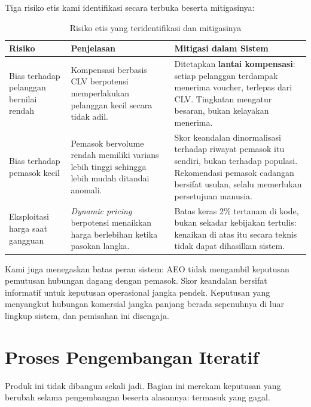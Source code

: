 \documentclass[12pt,a4paper]{article}
\begin{document}
Tiga risiko etis kami identifikasi secara terbuka beserta mitigasinya:

\begin{table}[H]
  \centering\footnotesize
  \caption{Risiko etis yang teridentifikasi dan mitigasinya}
  \begin{tabularx}{\textwidth}{L{3.5cm} Y Y}
    \toprule
    \textbf{Risiko} & \textbf{Penjelasan} & \textbf{Mitigasi dalam Sistem} \\
    \midrule
    Bias terhadap pelanggan bernilai rendah
      & Kompensasi berbasis CLV berpotensi memperlakukan pelanggan kecil secara tidak adil.
      & Ditetapkan \textbf{lantai kompensasi}: setiap pelanggan terdampak menerima voucher, terlepas dari CLV. Tingkatan mengatur besaran, bukan kelayakan menerima. \\[1.5pt]
    Bias terhadap pemasok kecil
      & Pemasok bervolume rendah memiliki varians lebih tinggi sehingga lebih mudah ditandai anomali.
      & Skor keandalan dinormalisasi terhadap riwayat pemasok itu sendiri, bukan terhadap populasi. Rekomendasi pemasok cadangan bersifat usulan, selalu memerlukan persetujuan manusia. \\[1.5pt]
    Eksploitasi harga saat gangguan
      & \textit{Dynamic pricing} berpotensi menaikkan harga berlebihan ketika pasokan langka.
      & Batas keras 2\% tertanam di kode, bukan sekadar kebijakan tertulis: kenaikan di atas itu secara teknis tidak dapat dihasilkan sistem. \\
    \bottomrule
  \end{tabularx}
\end{table}

Kami juga menegaskan batas peran sistem: AEO tidak mengambil keputusan pemutusan hubungan dagang dengan pemasok. Skor keandalan bersifat informatif untuk keputusan operasional jangka pendek. Keputusan yang menyangkut hubungan komersial jangka panjang berada sepenuhnya di luar lingkup sistem, dan pemisahan ini disengaja.

\section{Proses Pengembangan Iteratif}

Produk ini tidak dibangun sekali jadi. Bagian ini merekam keputusan yang berubah selama pengembangan beserta alasannya: termasuk yang gagal.
\end{document}
